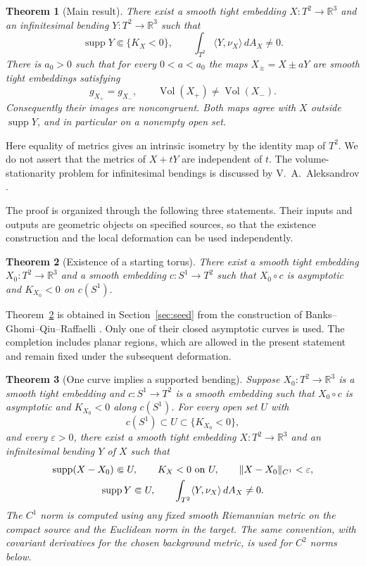 \documentclass[11pt]{amsart}
\newtheorem{theorem}{Theorem}[section]
\theoremstyle{definition}
\newcommand{\R}{\mathbb R}
\DeclareMathOperator{\supp}{supp}
\DeclareMathOperator{\Vol}{Vol}
\begin{document}
\begin{theorem}[Main result]\label{thm:main}
There exist a smooth tight embedding $X:T^2\to\R^3$ and an
infinitesimal bending $Y:T^2\to\R^3$ such that
\[
 \supp Y\Subset\{K_X<0\},
 \qquad \int_{T^2}\langle Y,\nu_X\rangle\,dA_X\ne0.
\]
There is $a_0>0$ such that for every $0<a<a_0$ the maps
$X_\pm=X\pm aY$ are smooth tight embeddings satisfying
\begin{equation}\label{eq:main-pair}
 g_{X_+}=g_{X_-},\qquad \Vol(X_+)\ne\Vol(X_-).
\end{equation}
Consequently their images are noncongruent. Both maps agree with $X$
outside $\supp Y$, and in particular on a nonempty open set.
\end{theorem}

Here equality of metrics gives an intrinsic isometry by the identity
map of $T^2$. We do not assert that the metrics of $X+tY$ are independent
of $t$. The volume-stationarity problem for infinitesimal bendings is
discussed by V.~A.~Aleksandrov \cite{Aleksandrov}.

The proof is organized through the following three statements. Their
inputs and outputs are geometric objects on specified sources, so that
the existence construction and the local deformation can be used
independently.

\begin{theorem}[Existence of a starting torus]\label{thm:seed}
There exist a smooth tight embedding $X_0:T^2\to\R^3$ and a smooth
embedding $c:S^1\to T^2$ such that $X_0\circ c$ is asymptotic and
$K_{X_0}<0$ on $c(S^1)$.
\end{theorem}

Theorem~\ref{thm:seed} is obtained in Section~\ref{sec:seed} from the
construction of Banks--Ghomi--Qiu--Raffaelli \cite{BGQR}. Only one of
their closed asymptotic curves is used. The completion includes planar
regions, which are allowed in the present statement and remain fixed
under the subsequent deformation.

\begin{theorem}[One curve implies a supported bending]\label{thm:one-curve}
Suppose $X_0:T^2\to\R^3$ is a smooth tight embedding and
$c:S^1\to T^2$ is a smooth embedding such that $X_0\circ c$ is
asymptotic and $K_{X_0}<0$ along $c(S^1)$.
For every open set $U$ with
\[
 c(S^1)\subset U\subset\{K_{X_0}<0\},
\]
and every $\varepsilon>0$, there exist a smooth tight embedding
$X:T^2\to\R^3$ and an infinitesimal bending $Y$ of $X$ such that
\begin{equation}\label{eq:one-curve-output}
 \begin{gathered}
 \supp(X-X_0)\Subset U,\qquad K_X<0\ \hbox{on }U,\qquad
 \|X-X_0\|_{C^1}<\varepsilon,\\
 \supp Y\Subset U,\qquad
 \int_{T^2}\langle Y,\nu_X\rangle\,dA_X\ne0.
 \end{gathered}
\end{equation}
The $C^1$ norm is computed using any fixed smooth Riemannian metric
on the compact source and the Euclidean norm in the target.
The same convention, with covariant derivatives for the chosen
background metric, is used for $C^2$ norms below.
\end{theorem}
\end{document}
